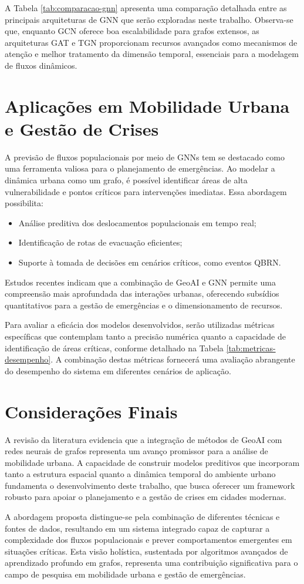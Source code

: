A Tabela \ref{tab:comparacao-gnn} apresenta uma comparação detalhada entre as principais arquiteturas de \gls{GNN} que serão exploradas neste trabalho. Observa-se que, enquanto GCN oferece boa escalabilidade para grafos extensos, as arquiteturas GAT e TGN proporcionam recursos avançados como mecanismos de atenção e melhor tratamento da dimensão temporal, essenciais para a modelagem de fluxos dinâmicos.

\section{Aplicações em Mobilidade Urbana e Gestão de Crises}
A previsão de fluxos populacionais por meio de \gls{GNN}s tem se destacado como uma ferramenta valiosa para o planejamento de emergências. Ao modelar a dinâmica urbana como um grafo, é possível identificar áreas de alta vulnerabilidade e pontos críticos para intervenções imediatas. Essa abordagem possibilita:
\begin{itemize}[noitemsep]
    \item Análise preditiva dos deslocamentos populacionais em tempo real;
    \item Identificação de rotas de evacuação eficientes;
    \item Suporte à tomada de decisões em cenários críticos, como eventos \gls{QBRN}.
\end{itemize}
Estudos recentes indicam que a combinação de \gls{GeoAI} e \gls{GNN} permite uma compreensão mais aprofundada das interações urbanas, oferecendo subsídios quantitativos para a gestão de emergências e o dimensionamento de recursos.

Para avaliar a eficácia dos modelos desenvolvidos, serão utilizadas métricas específicas que contemplam tanto a precisão numérica quanto a capacidade de identificação de áreas críticas, conforme detalhado na Tabela \ref{tab:metricas-desempenho}. A combinação destas métricas fornecerá uma avaliação abrangente do desempenho do sistema em diferentes cenários de aplicação.

\section{Considerações Finais}
A revisão da literatura evidencia que a integração de métodos de \gls{GeoAI} com redes neurais de grafos representa um avanço promissor para a análise de mobilidade urbana. A capacidade de construir modelos preditivos que incorporam tanto a estrutura espacial quanto a dinâmica temporal do ambiente urbano fundamenta o desenvolvimento deste trabalho, que busca oferecer um framework robusto para apoiar o planejamento e a gestão de crises em cidades modernas.

A abordagem proposta distingue-se pela combinação de diferentes técnicas e fontes de dados, resultando em um sistema integrado capaz de capturar a complexidade dos fluxos populacionais e prever comportamentos emergentes em situações críticas. Esta visão holística, sustentada por algoritmos avançados de aprendizado profundo em grafos, representa uma contribuição significativa para o campo de pesquisa em mobilidade urbana e gestão de emergências.
